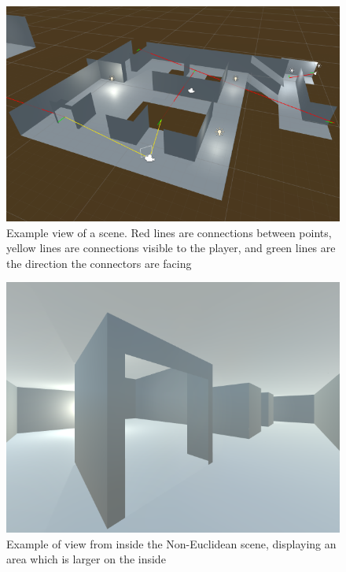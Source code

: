 	\begin{figure}[h]
		\label{design:fig:scene}
		\includegraphics[width=1\textwidth]{Images/Lines_Everywhere2}
		\centering
		\caption{Example view of a scene.
			Red lines are connections between points,
			yellow lines are connections visible to the player,
			and green lines are the direction the connectors are facing}
	\end{figure}

	\begin{figure}[h]
		\label{design:fig:game}
		\includegraphics[width=1\textwidth]{Images/NE_View}
		\centering
		\caption{Example of view from inside the Non-Euclidean scene, displaying an area which is larger on the inside}
	\end{figure}

\begin{multicols*}{2}

	\section][Environment Design]{Design of experiment environments}


\end{multicols*}
